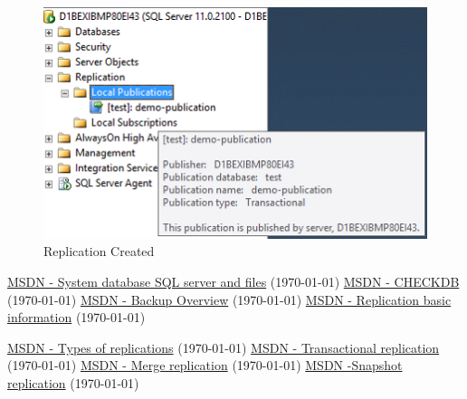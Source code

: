\documentclass[english]{article}
\begin{document}
\begin{figure}[H]
\centerline{\includegraphics[scale=0.8]{administration/rep/14}}
\caption{ Replication Created}
\end{figure}
\newpage
\begin{thebibliography}{@@@@}
			\href{http://msdn.microsoft.com/en-us/library/ms178028.aspx }{MSDN - System database SQL server and files}
 (\today)
			\href{http://msdn.microsoft.com/en-us/library/ms176064.aspx  }{MSDN - CHECKDB}  (\today)	
			\href{http://msdn.microsoft.com/en-us/library/ms175477.aspx}{MSDN - Backup Overview}  (\today)	
			\href{http://msdn.microsoft.com/en-us/library/ms151198(v=sql.110).aspx}{MSDN -  Replication basic information}  (\today)
			
			\href{http://msdn.microsoft.com/en-us/library/ms152531(v=sql.110).aspx}{MSDN - Types of replications}  (\today)
			\href{http://msdn.microsoft.com/en-us/library/ms151176(v=sql.110).aspx}{MSDN -   Transactional replication}  (\today)
			\href{http://msdn.microsoft.com/en-us/library/ms152746(v=sql.110).aspx}{MSDN -  Merge replication}  (\today)
			\href{http://msdn.microsoft.com/en-us/library/ms152746(v=sql.110).aspx  }{MSDN -Snapshot replication}  (\today)

				

	\end{thebibliography}
	
\end{document}
